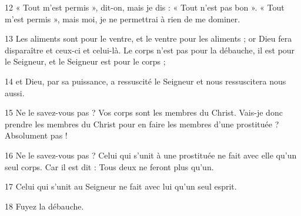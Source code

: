 
12 « Tout m’est permis », dit-on, mais je dis : « Tout n'est pas bon ». « Tout m’est permis », mais moi, je ne permettrai à rien de me dominer.

13 Les aliments sont pour le ventre, et le ventre pour les aliments ; or Dieu fera disparaître et ceux-ci et celui-là. Le corps n’est pas pour la débauche, il est pour le Seigneur, et le Seigneur est pour le corps ;

14 et Dieu, par sa puissance, a ressuscité le Seigneur et nous ressuscitera nous aussi.

15 Ne le savez-vous pas ? Vos corps sont les membres du Christ. Vais-je donc prendre les membres du Christ pour en faire les membres d’une prostituée ? Absolument pas !

16 Ne le savez-vous pas ? Celui qui s’unit à une prostituée ne fait avec elle qu’un seul corps. Car il est dit : Tous deux ne feront plus qu’un.

17 Celui qui s’unit au Seigneur ne fait avec lui qu’un seul esprit.

18 Fuyez la débauche.